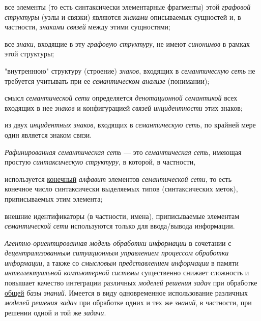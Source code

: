 \begin{textitemize}
	\item все элементы (то есть синтаксически элементарные фрагменты) этой \textit{графовой структуры} (узлы и связки) являются \textit{знаками} описываемых сущностей и, в частности, \textit{знаками связей} между этими сущностями;
	\item все \textit{знаки}, входящие в эту \textit{графовую структуру}, не имеют \textit{синонимов} в рамках этой структуры;
	\item "внутреннюю"{} структуру (строение) \textit{знаков}, входящих в \textit{семантическую сеть} не требуется учитывать при ее \textit{семантическом анализе} (понимании);
	\item смысл \textit{семантической сети} определяется \textit{денотационной семантикой} всех входящих в нее \textit{знаков} и конфигурацией \textit{связей инцидентности} этих знаков;
	\item из двух \textit{инцидентных знаков}, входящих в \textit{семантическую сеть}, по крайней мере один является знаком связи.
\end{textitemize}

\textit{Рафинированная семантическая сеть} --- это \textit{семантическая сеть}, имеющая простую \textit{синтаксическую структуру}, в которой, в частности,

\begin{textitemize}
	\item используется \underline{конечный} \textit{алфавит} элементов \textit{семантической сети}, то есть конечное число синтаксически выделяемых типов (синтаксических меток), приписываемых этим элемента;
	\item внешние идентификаторы (в частности, имена), приписываемые элементам \textit{семантической сети} используются только для ввода/вывода информации.
\end{textitemize}

\textit{Агентно-ориентированная модель обработки информации} в сочетании с \textit{децентрализованным ситуационным управлением процессом обработки информации}, а также со \textit{смысловым представлением информации} в памяти \textit{интеллектуальной компьютерной системы} существенно снижает сложность и повышает качество интеграции различных \textit{моделей решения задач} при обработке \underline{общей} \textit{базы знаний}. Имеется в виду одновременное использование различных \textit{моделей решения задач} при обработке одних и тех же \textit{знаний}, в частности, при решении одной и той же \textit{задачи}.

